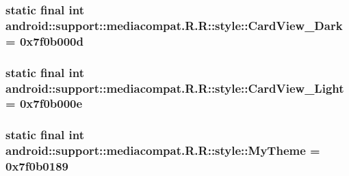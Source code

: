 \hypertarget{classandroid_1_1support_1_1mediacompat_1_1_r_1_1style_4faa0bc4837a0b44a9aed147e5cf56e2}{
\subsubsection[{CardView\_\-Dark}]{\setlength{\rightskip}{0pt plus 5cm}static final int android::support::mediacompat.R.R::style::CardView\_\-Dark = 0x7f0b000d}}
\label{classandroid_1_1support_1_1mediacompat_1_1_r_1_1style_4faa0bc4837a0b44a9aed147e5cf56e2}


\hypertarget{classandroid_1_1support_1_1mediacompat_1_1_r_1_1style_dd5e28e68736df187417eb1294bbc56a}{
\subsubsection[{CardView\_\-Light}]{\setlength{\rightskip}{0pt plus 5cm}static final int android::support::mediacompat.R.R::style::CardView\_\-Light = 0x7f0b000e}}
\label{classandroid_1_1support_1_1mediacompat_1_1_r_1_1style_dd5e28e68736df187417eb1294bbc56a}


\hypertarget{classandroid_1_1support_1_1mediacompat_1_1_r_1_1style_37b5e9916178e220efbd72f6cb83f102}{
\subsubsection[{MyTheme}]{\setlength{\rightskip}{0pt plus 5cm}static final int android::support::mediacompat.R.R::style::MyTheme = 0x7f0b0189}}
\label{classandroid_1_1support_1_1mediacompat_1_1_r_1_1style_37b5e9916178e220efbd72f6cb83f102}


